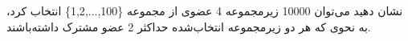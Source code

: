 \p
    نشان دهید می‌توان 10000 زیرمجموعه 4 عضوی از مجموعه \{100,...,1,2\} انتخاب کرد، به نحوی که هر دو    زیرمجموعه انتخاب‌شده حداکثر 2 عضو مشترک داشته‌باشند.
